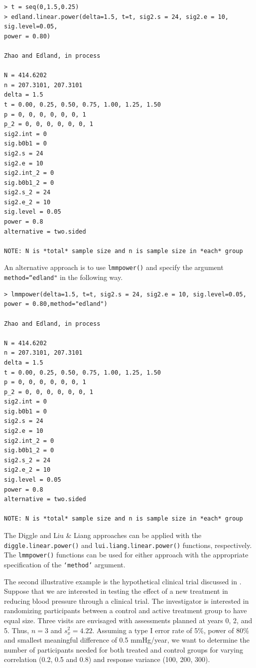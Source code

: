 \begin{mdframed}
	\begin{verbatim}
> t = seq(0,1.5,0.25)
> edland.linear.power(delta=1.5, t=t, sig2.s = 24, sig2.e = 10, sig.level=0.05, 
power = 0.80)

Zhao and Edland, in process 

N = 414.6202
n = 207.3101, 207.3101
delta = 1.5
t = 0.00, 0.25, 0.50, 0.75, 1.00, 1.25, 1.50
p = 0, 0, 0, 0, 0, 0, 1
p_2 = 0, 0, 0, 0, 0, 0, 1
sig2.int = 0
sig.b0b1 = 0
sig2.s = 24
sig2.e = 10
sig2.int_2 = 0
sig.b0b1_2 = 0
sig2.s_2 = 24
sig2.e_2 = 10
sig.level = 0.05
power = 0.8
alternative = two.sided

NOTE: N is *total* sample size and n is sample size in *each* group 
	\end{verbatim}
\end{mdframed}
An alternative approach is to use \texttt{lmmpower()} and specify the argument \texttt{method=``edland"} in the following way.

\begin{mdframed}
\begin{verbatim}
> lmmpower(delta=1.5, t=t, sig2.s = 24, sig2.e = 10, sig.level=0.05, 
power = 0.80,method="edland")

Zhao and Edland, in process 

N = 414.6202
n = 207.3101, 207.3101
delta = 1.5
t = 0.00, 0.25, 0.50, 0.75, 1.00, 1.25, 1.50
p = 0, 0, 0, 0, 0, 0, 1
p_2 = 0, 0, 0, 0, 0, 0, 1
sig2.int = 0
sig.b0b1 = 0
sig2.s = 24
sig2.e = 10
sig2.int_2 = 0
sig.b0b1_2 = 0
sig2.s_2 = 24
sig2.e_2 = 10
sig.level = 0.05
power = 0.8
alternative = two.sided

NOTE: N is *total* sample size and n is sample size in *each* group 
\end{verbatim}
\end{mdframed}
The Diggle and Liu \& Liang approaches can be applied with the \texttt{diggle.linear.power()} and 
\texttt{lui.liang.linear.power()} functions, respectively. The \texttt{lmmpower()} functions can be used for either approach with the appropriate specification of the \texttt{`method'} argument. 

The second illustrative example is the hypothetical clinical trial discussed in \cite{Diggle_etal(2002)}. Suppose that we are interested in testing the effect of a new treatment in reducing blood pressure through a clinical trial. The investigator is interested in randomizing participants between a control and active treatment group to have equal size. Three visits are envisaged with assessments planned at years 0, 2, and 5. Thus, $n=3$ and $s^2_x=4.22$. Assuming a type I error rate of 5\%, power of 80\% and smallest meaningful difference of 0.5 mmHg/year, we want to determine the number of participants needed for both treated and control groups for varying correlation (0.2, 0.5 and 0.8) and response variance (100, 200, 300).



